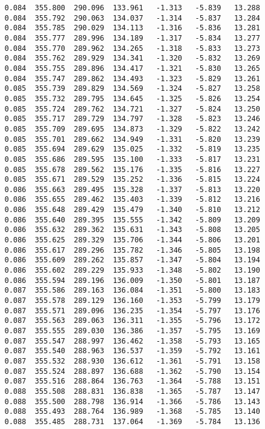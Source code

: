 \begin{verbatim}
   0.084  355.800  290.096  133.961   -1.313   -5.839   13.288
   0.084  355.792  290.063  134.037   -1.314   -5.837   13.284
   0.084  355.785  290.029  134.113   -1.316   -5.836   13.281
   0.084  355.777  289.996  134.189   -1.317   -5.834   13.277
   0.084  355.770  289.962  134.265   -1.318   -5.833   13.273
   0.084  355.762  289.929  134.341   -1.320   -5.832   13.269
   0.084  355.755  289.896  134.417   -1.321   -5.830   13.265
   0.084  355.747  289.862  134.493   -1.323   -5.829   13.261
   0.085  355.739  289.829  134.569   -1.324   -5.827   13.258
   0.085  355.732  289.795  134.645   -1.325   -5.826   13.254
   0.085  355.724  289.762  134.721   -1.327   -5.824   13.250
   0.085  355.717  289.729  134.797   -1.328   -5.823   13.246
   0.085  355.709  289.695  134.873   -1.329   -5.822   13.242
   0.085  355.701  289.662  134.949   -1.331   -5.820   13.239
   0.085  355.694  289.629  135.025   -1.332   -5.819   13.235
   0.085  355.686  289.595  135.100   -1.333   -5.817   13.231
   0.085  355.678  289.562  135.176   -1.335   -5.816   13.227
   0.085  355.671  289.529  135.252   -1.336   -5.815   13.224
   0.086  355.663  289.495  135.328   -1.337   -5.813   13.220
   0.086  355.655  289.462  135.403   -1.339   -5.812   13.216
   0.086  355.648  289.429  135.479   -1.340   -5.810   13.212
   0.086  355.640  289.395  135.555   -1.342   -5.809   13.209
   0.086  355.632  289.362  135.631   -1.343   -5.808   13.205
   0.086  355.625  289.329  135.706   -1.344   -5.806   13.201
   0.086  355.617  289.296  135.782   -1.346   -5.805   13.198
   0.086  355.609  289.262  135.857   -1.347   -5.804   13.194
   0.086  355.602  289.229  135.933   -1.348   -5.802   13.190
   0.086  355.594  289.196  136.009   -1.350   -5.801   13.187
   0.087  355.586  289.163  136.084   -1.351   -5.800   13.183
   0.087  355.578  289.129  136.160   -1.353   -5.799   13.179
   0.087  355.571  289.096  136.235   -1.354   -5.797   13.176
   0.087  355.563  289.063  136.311   -1.355   -5.796   13.172
   0.087  355.555  289.030  136.386   -1.357   -5.795   13.169
   0.087  355.547  288.997  136.462   -1.358   -5.793   13.165
   0.087  355.540  288.963  136.537   -1.359   -5.792   13.161
   0.087  355.532  288.930  136.612   -1.361   -5.791   13.158
   0.087  355.524  288.897  136.688   -1.362   -5.790   13.154
   0.087  355.516  288.864  136.763   -1.364   -5.788   13.151
   0.088  355.508  288.831  136.838   -1.365   -5.787   13.147
   0.088  355.500  288.798  136.914   -1.366   -5.786   13.143
   0.088  355.493  288.764  136.989   -1.368   -5.785   13.140
   0.088  355.485  288.731  137.064   -1.369   -5.784   13.136

\end{verbatim}
